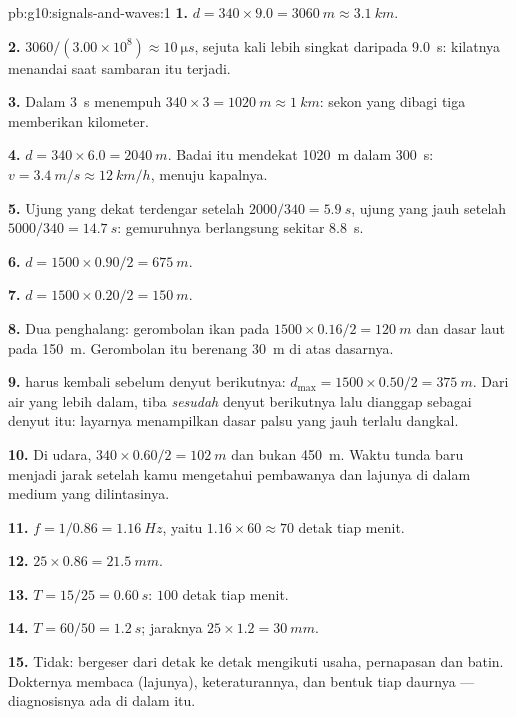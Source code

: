 \begin{solution}{pb:g10:signals-and-waves:1}
\textbf{1.} $d = 340 \times 9.0 = \qty{3060}{m} \approx \qty{3.1}{km}$.

\textbf{2.} $3060/(3.00\times10^{8}) \approx \qty{10}{\micro s}$,
sejuta kali lebih singkat daripada \qty{9.0}{s}: kilatnya menandai saat
sambaran itu terjadi.

\textbf{3.} Dalam \qty{3}{s}  menempuh
$340 \times 3 = \qty{1020}{m}
\approx \qty{1}{km}$: sekon yang dibagi
tiga memberikan kilometer.

\textbf{4.} $d = 340 \times 6.0 = \qty{2040}{m}$. Badai itu mendekat
\qty{1020}{m} dalam \qty{300}{s}: $v = \qty{3.4}{m/s} \approx
\qty{12}{km/h}$, menuju kapalnya.

\textbf{5.} Ujung yang dekat terdengar setelah
$2000/340 = \qty{5.9}{s}$, ujung yang jauh setelah
$5000/340 = \qty{14.7}{s}$: gemuruhnya berlangsung sekitar
\qty{8.8}{s}.

\textbf{6.} $d = 1500 \times 0.90/2 = \qty{675}{m}$.

\textbf{7.} $d = 1500 \times 0.20/2 = \qty{150}{m}$.

\textbf{8.} Dua penghalang: gerombolan ikan pada
$1500 \times 0.16/2 =
\qty{120}{m}$ dan dasar laut pada \qty{150}{m}.
Gerombolan itu berenang \qty{30}{m} di atas dasarnya.

\textbf{9.}  harus kembali sebelum denyut berikutnya:
$d_{\max} = 1500 \times 0.50/2 = \qty{375}{m}$. Dari air yang lebih
dalam,  tiba \emph{sesudah} denyut berikutnya lalu dianggap
sebagai  denyut itu: layarnya menampilkan dasar palsu yang jauh
terlalu dangkal.

\textbf{10.} Di udara, $340 \times 0.60/2 = \qty{102}{m}$ dan bukan
\qty{450}{m}. Waktu tunda baru menjadi jarak setelah kamu mengetahui
pembawanya dan lajunya di dalam medium yang dilintasinya.

\textbf{11.} $f = 1/0.86 = \qty{1.16}{Hz}$, yaitu $1.16 \times 60
\approx 70$ detak tiap menit.

\textbf{12.} $25 \times 0.86 = \qty{21.5}{mm}$.

\textbf{13.} $T = 15/25 = \qty{0.60}{s}$: $100$ detak tiap menit.

\textbf{14.} $T = 60/50 = \qty{1.2}{s}$; jaraknya
$25 \times 1.2 = \qty{30}{mm}$.

\textbf{15.} Tidak:  bergeser dari detak ke detak mengikuti
usaha, pernapasan dan  batin. Dokternya membaca 
(lajunya), keteraturannya, dan bentuk tiap daurnya --- diagnosisnya ada
di dalam  itu.


\end{solution}
